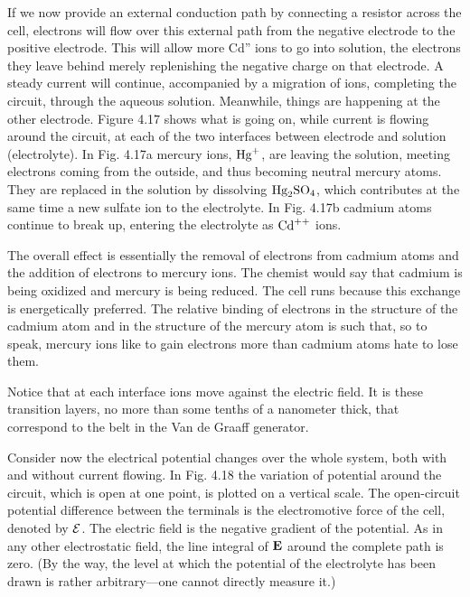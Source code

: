 If we now provide an external conduction path by connecting a
resistor across the cell, electrons will flow over this external path
from the negative electrode to the positive electrode. This will allow
more Cd'' ions to go into solution, the electrons they leave behind
merely replenishing the negative charge on that electrode. A steady
current will continue, accompanied by a migration of ions, completing
the circuit, through the aqueous solution. Meanwhile, things
are happening at the other electrode. Figure 4.17 shows what is
going on, while current is flowing around the circuit, at each of the
two interfaces between electrode and solution (electrolyte). In
Fig. 4.17a mercury ions, $\textup{Hg}^+$, are leaving the solution, meeting electrons
coming from the outside, and thus becoming neutral mercury
atoms. They are replaced in the solution by dissolving $\textup{Hg}_2\textup{SO}_4$,
which contributes at the same time a new sulfate ion to the electrolyte.
In Fig. 4.17b cadmium atoms continue to break up, entering
the electrolyte as $\textup{Cd}^{++}$ ions.

The overall effect is essentially the removal of electrons from cadmium
atoms and the addition of electrons to mercury ions. The
chemist would say that cadmium is being oxidized and mercury is
being reduced. The cell runs because this exchange is energetically
preferred. The relative binding of electrons in the structure of the
cadmium atom and in the structure of the mercury atom is such that,
so to speak, mercury ions like to gain electrons more than cadmium
atoms hate to lose them.

Notice that at each interface ions move against the electric field.
It is these transition layers, no more than some tenths of a nanometer thick, that
correspond to the belt in the Van de Graaff generator.

Consider now the electrical potential changes over the whole 
system, both with and without current flowing. In Fig. 4.18 the variation
of potential around the circuit, which is open at one point, is
plotted on a vertical scale. The open-circuit potential difference
between the terminals is the electromotive force of the cell, denoted
by $\mathcal{E}$. The electric field is the negative gradient of the potential. As
in any other electrostatic field, the line integral of $\mathbf{E}$ around the 
complete path is zero. (By the way, the level at which the potential of
the electrolyte has been drawn is rather arbitrary---one cannot
directly measure it.)

